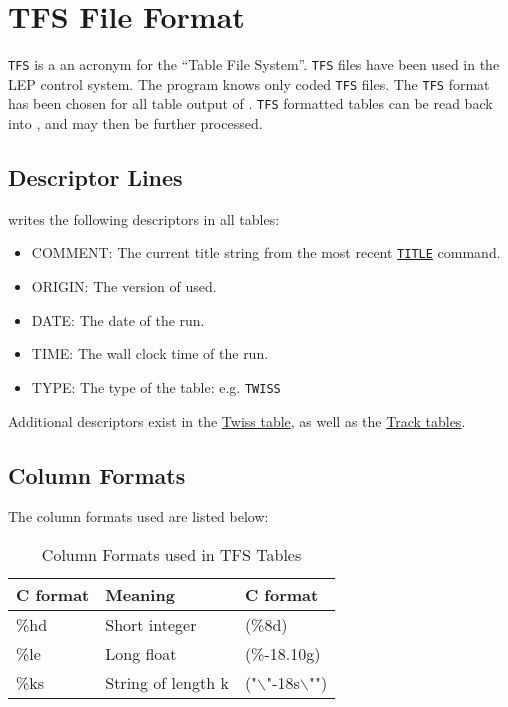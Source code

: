 
\chapter{TFS File Format}
\label{chap:tfs}

\texttt{TFS}\cite{TFS} is a an acronym for the ``Table File
System''. \texttt{TFS} files have been used in the LEP control
system. The \mad program knows only coded \texttt{TFS} files. The
\texttt{TFS} format has been chosen for all table output of
\madx. \texttt{TFS} formatted tables can be read back into \madx, and
may then be further processed. 
 
\section{Descriptor Lines}
\label{sec:tfs_desc}

\madx writes the following descriptors in all tables: 
\begin{itemize}
   \item COMMENT: The current title string from the most recent 
   \hyperref[sec:title]{\tt TITLE} command. 
   \item ORIGIN: The version of \madx used. 
   \item DATE: The date of the \madx run. 
   \item TIME: The wall clock time of the \madx run. 
   \item TYPE: The type of the table: e.g. {\tt TWISS} 
\end{itemize} 

Additional descriptors exist in the \href{twiss_desc.html}{Twiss table},
as well as the \href{tables.html#track}{Track tables}.  



\section{Column Formats}
\label{sec:tfs_columns}

The column formats used are listed below: 

\begin{table}[ht]
  \begin{center}
    \caption{ Column Formats used in TFS Tables}    
    \vspace{1ex}
    \begin{tabular}{|l l l|}
      \hline
      \textbf{C format} & \textbf{Meaning} & \textbf{C format} \\ 
      \hline
      \%hd & Short integer & (\%8d) \\ 
      \%le & Long float & (\%-18.10g) \\ 
      \%ks & String of length k & ("$\backslash$"-18s$\backslash$"")\\
      \hline
   \end{tabular}
  \end{center}
\end{table}

